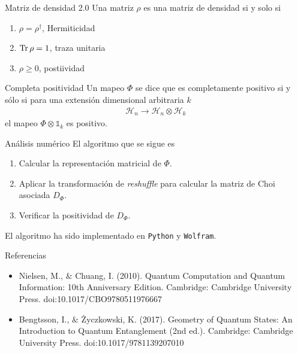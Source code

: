 \documentclass[11pt,xcolor=dvipsnames]{beamer}
\begin{document}
\begin{frame}{Matriz de densidad 2.0}
	Una matriz $\rho$ es una matriz de densidad si y solo si 
	\begin{enumerate}
		\item $\rho = \rho ^{\dagger}$, Hermiticidad
		\item $\Tr \rho = 1$, traza unitaria 
		\item $\rho \geq 0$, postiividad
	\end{enumerate}
\end{frame}

\begin{frame}{Completa positividad}
	Un mapeo $\Phi$ se dice que es completamente positivo si y sólo si para
	una extensión dimensional arbitraria $k$
	\begin{align*}
		\mathcal{H}_n \rightarrow \mathcal{H}_n \otimes \mathcal{H}_k
	\end{align*}
	el mapeo $\Phi \otimes \mathbb{1}_k$ es positivo.
\end{frame}

\begin{frame}{Análisis numérico}
	El algoritmo que se sigue es 
	\begin{enumerate}
		\item Calcular la representación matricial de $\Phi$.
		\item Aplicar la transformación de \textit{reshuffle} para calcular la
					matriz de Choi asociada $D_{\Phi}$.
		\item Verificar la positividad de $D_{\Phi}$.
	\end{enumerate}
	\vfill 
	
	El algoritmo ha sido implementado en \texttt{Python} y \texttt{Wolfram}.
\end{frame}

\begin{frame}{Referencias}
	\begin{itemize}
		\item Nielsen, M., $\&$ Chuang, I. (2010). Quantum Computation and 
		Quantum Information: 10th Anniversary Edition. Cambridge: 
		Cambridge University Press. doi:10.1017/CBO9780511976667
		\item Bengtsson, I., $\&$ Życzkowski, K. (2017). Geometry of Quantum 
		States: An Introduction to Quantum Entanglement (2nd ed.). Cambridge: 
		Cambridge University Press. doi:10.1017/9781139207010
	\end{itemize}
\end{frame}
\end{document}
